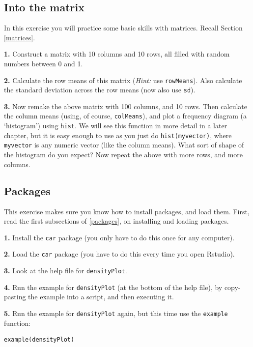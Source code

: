 \documentclass[]{book}
\begin{document}
\hypertarget{into-the-matrix}{%
\subsection{Into the matrix}\label{into-the-matrix}}

In this exercise you will practice some basic skills with matrices. Recall Section \ref{matrices}.

\textbf{1.} Construct a matrix with 10 columns and 10 rows, all filled with random numbers between 0 and 1.

\textbf{2.} Calculate the row means of this matrix (\emph{Hint:} use \texttt{rowMeans}). Also calculate the standard deviation across the row means (now also use \texttt{sd}).

\textbf{3.} Now remake the above matrix with 100 columns, and 10 rows. Then calculate the column means (using, of course, \texttt{colMeans}), and plot a frequency diagram (a `histogram') using \texttt{hist}. We will see this function in more detail in a later chapter, but it is easy enough to use as you just do \texttt{hist(myvector)}, where \texttt{myvector} is any numeric vector (like the column means). What sort of shape of the histogram do you expect? Now repeat the above with more rows, and more columns.

\hypertarget{packages-1}{%
\subsection{Packages}\label{packages-1}}

This exercise makes sure you know how to install packages, and load them. First, read the first subsections of \ref{packages}, on installing and loading packages.

\textbf{1.} Install the \texttt{car} package (you only have to do this once for any computer).

\textbf{2.} Load the \texttt{car} package (you have to do this every time you open Rstudio).

\textbf{3.} Look at the help file for \texttt{densityPlot}.

\textbf{4.} Run the example for \texttt{densityPlot} (at the bottom of the help file), by copy-pasting the example into a script, and then executing it.

\textbf{5.} Run the example for \texttt{densityPlot} again, but this time use the \texttt{example} function:

\begin{verbatim}
example(densityPlot)
\end{verbatim}
\end{document}
